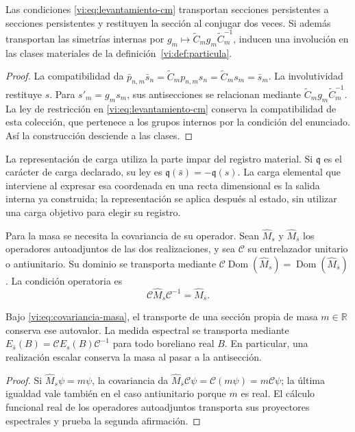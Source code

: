 \begin{proposition}
\label{vi:prop:antiseccion-persistente}
Las condiciones \eqref{vi:eq:levantamiento-cm} transportan secciones
persistentes a secciones persistentes y restituyen la sección al
conjugar dos veces. Si además transportan las simetrías internas por
$g_m\mapsto\widetilde C_mg_m\widetilde C_m^{-1}$, inducen una
involución en las clases materiales de la
definición~\ref{vi:def:particula}.
\end{proposition}
\begin{proof}
La compatibilidad da
$\bar p_{n,m}\bar s_n=\widetilde C_mp_{n,m}s_n
=\widetilde C_ms_m=\bar s_m$.
La involutividad restituye $s$. Para $s'_m=g_ms_m$, sus
antisecciones se relacionan mediante
$\widetilde C_mg_m\widetilde C_m^{-1}$. La ley de restricción
en \eqref{vi:eq:levantamiento-cm} conserva la compatibilidad de esta
colección, que pertenece a los grupos internos por la condición del
enunciado. Así la construcción desciende a las clases.
\end{proof}

La representación de carga utiliza la parte impar del registro
material. Si $\mathfrak q$ es el carácter de carga declarado, su
ley es $\mathfrak q(\bar s)=-\mathfrak q(s)$. La carga elemental
que interviene al expresar esa coordenada en una recta dimensional es
la salida interna ya construida; la representación se aplica después
al estado, sin utilizar una carga objetivo para elegir su registro.

Para la masa se necesita la covariancia de su operador. Sean
$\widehat M_s$ y $\widehat M_{\bar s}$ los operadores autoadjuntos
de las dos realizaciones, y sea $\mathcal C$ su entrelazador
unitario o antiunitario. Su dominio se transporta mediante
$\mathcal C\operatorname{Dom}(\widehat M_s)
=\operatorname{Dom}(\widehat M_{\bar s})$. La condición operatoria es
\begin{equation}
 \mathcal C\widehat M_s\mathcal C^{-1}
 =\widehat M_{\bar s}.
 \label{vi:eq:covariancia-masa}
\end{equation}

\begin{proposition}
\label{vi:prop:masa-conjugada}
Bajo \eqref{vi:eq:covariancia-masa}, el transporte de una sección
propia de masa $m\in\mathbb R$ conserva ese autovalor. La medida
espectral se transporta mediante
$E_{\bar s}(B)=\mathcal C E_s(B)\mathcal C^{-1}$ para todo
boreliano real $B$. En particular, una realización escalar conserva
la masa al pasar a la antisección.
\end{proposition}
\begin{proof}
Si $\widehat M_s\psi=m\psi$, la covariancia da
$\widehat M_{\bar s}\mathcal C\psi
=\mathcal C(m\psi)=m\mathcal C\psi$; la última igualdad
vale también en el caso antiunitario porque $m$ es real. El cálculo
funcional real de los operadores autoadjuntos transporta sus
proyectores espectrales y prueba la segunda afirmación.
\end{proof}


